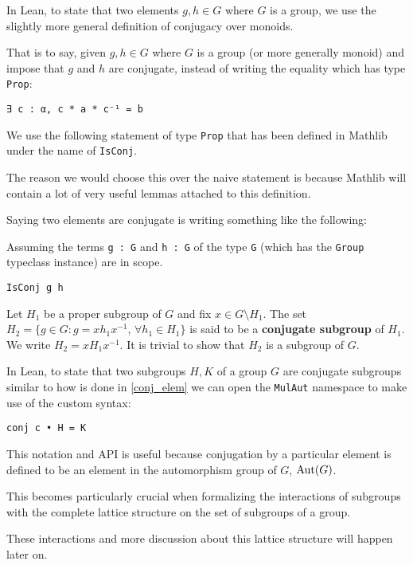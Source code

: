 \begin{remark}
\label{conj_elem}
In Lean, to state that two elements $g, h \in G$ where $G$ is a group, we use the slightly more general definition of conjugacy over monoids.

That is to say, given $g, h \in G$ where $G$ is a group (or more generally monoid) and impose that $g$ and $h$ are conjugate, instead of writing the equality which has type \texttt{Prop}:

\begin{verbatim}
∃ c : α, c * a * c⁻¹ = b
\end{verbatim}

We use the following statement of type \texttt{Prop} that has been defined in Mathlib under the name of \texttt{IsConj}.

The reason we would choose this over the naive statement is because Mathlib will contain a lot of very useful lemmas attached to this definition.

Saying two elements are conjugate is writing something like the following:

Assuming the terms \texttt{g : G} and \texttt{h : G} of the type \texttt{G} (which has the \texttt{Group} typeclass instance) are in scope.

\begin{verbatim}
IsConj g h
\end{verbatim}
\end{remark}


\begin{definition}
Let $H_1$ be a proper subgroup of $G$ and fix $x \in G \setminus H_1$. The set $H_2 = \{g \in G : g= xh_1x^{-1}$, $\forall h_1 \in H_1\}$ is said to be a \textbf{conjugate subgroup} of $H_1$. We write $H_2 = xH_1x^{-1}$. It is trivial to show that $H_2$ is a subgroup of $G$.
\end{definition}

\begin{remark}
In Lean, to state that two subgroups $H, K$ of a group $G$ are conjugate subgroups similar to how is done in \ref{conj_elem} we can open the \texttt{MulAut} namespace to make use of the custom syntax:

\begin{verbatim}
conj c • H = K 
\end{verbatim}

This notation and API is useful because conjugation by a particular element is defined to be an element in the automorphism group of $G$, $\operatorname{Aut}(G)$. 

This becomes particularly crucial when formalizing the interactions of subgroups with the complete lattice structure on the set of subgroups of a group. 

These interactions and more discussion about this lattice structure will happen later on.
\end{remark}

